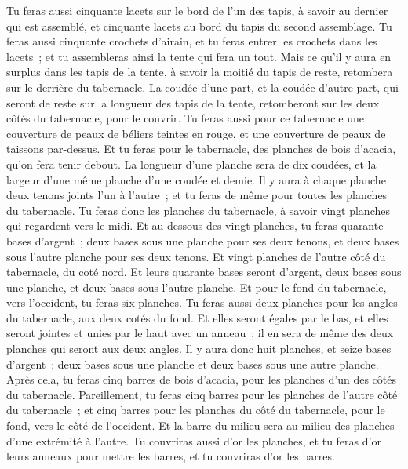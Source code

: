 \begin{multicols}{2}
Tu feras aussi cinquante lacets sur le bord de l'un des tapis, à savoir au dernier qui est assemblé, et cinquante lacets au bord du tapis du second assemblage.
Tu feras aussi cinquante crochets d'airain, et tu feras entrer les crochets dans les lacets~; et tu assembleras ainsi la tente qui fera un tout.
Mais ce qu'il y aura en surplus dans les tapis de la tente, à savoir la moitié du tapis de reste, retombera sur le derrière du tabernacle.
La coudée d'une part, et la coudée d'autre part, qui seront de reste sur la longueur des tapis de la tente, retomberont sur les deux côtés du tabernacle, pour le couvrir.
Tu feras aussi pour ce tabernacle une couverture de peaux de béliers teintes en rouge, et une couverture de peaux de taissons par-dessus.
Et tu feras pour le tabernacle, des planches de bois d'acacia, qu'on fera tenir debout.
La longueur d'une planche sera de dix coudées, et la largeur d'une même planche d'une coudée et demie.
Il y aura à chaque planche deux tenons joints l'un à l'autre~; et tu feras de même pour toutes les planches du tabernacle.
Tu feras donc les planches du tabernacle, à savoir vingt planches qui regardent vers le midi.
Et au-dessous des vingt planches, tu feras quarante bases d'argent~; deux bases sous une planche pour ses deux tenons, et deux bases sous l'autre planche pour ses deux tenons.
Et vingt planches de l'autre côté du tabernacle, du coté nord.
Et leurs quarante bases seront d'argent, deux bases sous une planche, et deux bases sous l'autre planche.
Et pour le fond du tabernacle, vers l'occident, tu feras six planches.
Tu feras aussi deux planches pour les angles du tabernacle, aux deux cotés du fond.
Et elles seront égales par le bas, et elles seront jointes et unies par le haut avec un anneau~; il en sera de même des deux planches qui seront aux deux angles.
Il y aura donc huit planches, et seize bases d'argent~; deux bases sous une planche et deux bases sous une autre planche.
Après cela, tu feras cinq barres de bois d'acacia, pour les planches d'un des côtés du tabernacle.
Pareillement, tu feras cinq barres pour les planches de l'autre côté du tabernacle~; et cinq barres pour les planches du côté du tabernacle, pour le fond, vers le côté de l'occident.
Et la barre du milieu sera au milieu des planches d'une extrémité à l'autre.
Tu couvriras aussi d'or les planches, et tu feras d'or leurs anneaux pour mettre les barres, et tu couvriras d'or les barres.

\end{multicols}
